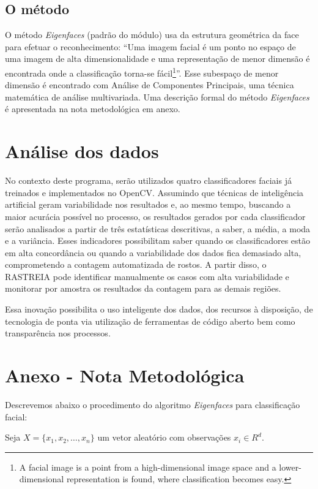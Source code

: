 \documentclass[a4paper, 12pt, openright, oneside, english, brazil, article]{abntex2}
\begin{document}
	\subsection*{O método}
	
	O método \textit{Eigenfaces} (padrão do módulo) usa da estrutura geométrica da face para efetuar o reconhecimento: ``Uma imagem facial é um ponto no espaço de uma imagem de alta dimensionalidade e uma representação de menor dimensão é encontrada onde a classificação torna-se fácil\footnote{A facial image is a point from a high-dimensional image space and a lower-dimensional representation is found, where classification becomes easy.}''. Esse subespaço de menor dimensão é encontrado com Análise de Componentes Principais, uma técnica matemática de análise multivariada. Uma descrição formal do método \textit{Eigenfaces} é apresentada na nota metodológica em anexo.
	
	\section*{Análise dos dados}
	
	No contexto deste programa, serão utilizados quatro classificadores faciais já treinados e implementados no OpenCV. Assumindo que técnicas de inteligência artificial geram variabilidade nos resultados e, ao mesmo tempo, buscando a maior acurácia possível no processo, os resultados gerados por cada classificador serão analisados a partir de três estatísticas descritivas, a saber, a média, a moda e a variância. Esses indicadores possibilitam saber quando os classificadores estão em alta concordância ou quando a variabilidade dos dados fica demasiado alta, comprometendo a contagem automatizada de rostos. A partir disso, o RASTREIA pode identificar manualmente os casos com alta variabilidade e monitorar por amostra os resultados da contagem para as demais regiões.
	
	Essa inovação possibilita o uso inteligente dos dados, dos recursos à disposição, de tecnologia de ponta via utilização de ferramentas de código aberto bem como transparência nos processos.
	
	
	\newpage
	\postextual
	\anexos
	\section*{Anexo - Nota Metodológica}
	Descrevemos abaixo o procedimento do algoritmo \textit{Eigenfaces} para classificação facial:
	
	Seja $X = \{x_1, x_2, \ldots, x_n\}$ um vetor aleatório com observações $x_i \in R^d$.
	
\end{document}
